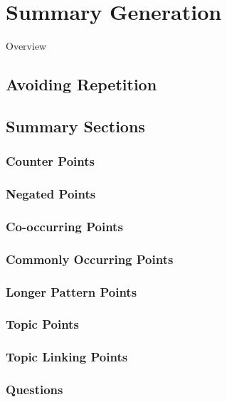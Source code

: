 \chapter{Summary Generation\label{chap:summary-generation}}
  Overview
  \section{Avoiding Repetition}
  \section{Summary Sections}
    \subsection{Counter Points}
    \subsection{Negated Points}
    \subsection{Co-occurring Points}
    \subsection{Commonly Occurring Points}
    \subsection{Longer Pattern Points}
    \subsection{Topic Points}
    \subsection{Topic Linking Points}
    \subsection{Questions}
